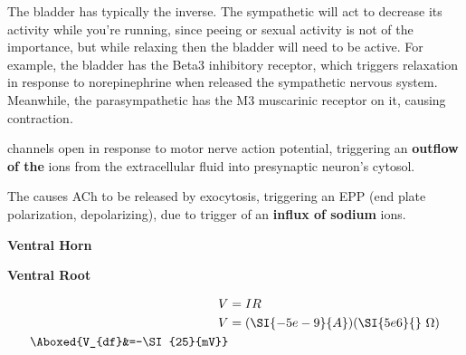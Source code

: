 \documentclass[basic]{inVerba-notes}
\begin{document}
\begin{enumerate}
  The bladder has typically the inverse. The sympathetic will act to decrease its activity while you're running, since peeing or sexual activity is not of the importance, but while relaxing then the bladder will need to be active. For example, the bladder has the Beta3 inhibitory receptor, which triggers relaxation in response to norepinephrine when released the sympathetic nervous system. Meanwhile, the parasympathetic has the M3 muscarinic receptor on it, causing contraction.

  

   channels open in response to motor nerve action potential, triggering an \textbf{outflow of the } ions from the extracellular fluid into presynaptic neuron's cytosol.


  The  causes ACh to be released by exocytosis, triggering an EPP (end plate polarization, depolarizing), due to trigger of an \textbf{influx of sodium} ions.


  \begin{center}
    \textbf{Ventral Horn}
  \end{center}
  

  \begin{center}
    \textbf{Ventral Root}
  \end{center}

  
  \begin{align*}
    V&=IR\\
    V&=(\SI{-5e-9}{A})(\SI{5e6}{}~\Omega )\\
    \Aboxed{V_{df}&=-\SI{25}{mV}}
  \end{align*}


\end{enumerate}
\end{document}
